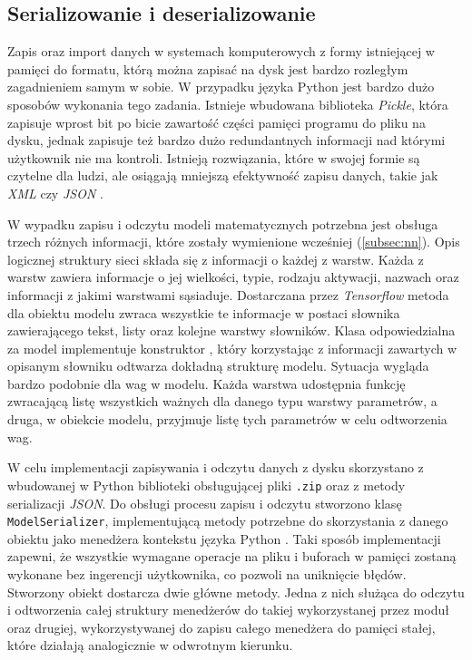 \subsection{Serializowanie i deserializowanie}
Zapis oraz import danych w systemach komputerowych z formy istniejącej w pamięci do formatu, którą można zapisać na dysk jest bardzo rozległym zagadnieniem samym w sobie. W przypadku języka Python jest bardzo dużo sposobów wykonania tego zadania. Istnieje wbudowana biblioteka \textit{Pickle}, która zapisuje wprost bit po bicie zawartość części pamięci programu do pliku na dysku, jednak zapisuje też bardzo dużo redundantnych informacji nad którymi użytkownik nie ma kontroli. Istnieją rozwiązania, które w swojej formie są czytelne dla ludzi, ale osiągają mniejszą efektywność zapisu danych, takie jak \textit{XML} \cite{book:xml_handbook} czy \textit{JSON} \cite{book:json_for_begginers}. 

W wypadku zapisu i odczytu modeli matematycznych potrzebna jest obsługa trzech różnych informacji, które zostały wymienione wcześniej (\ref{subsec:nn}). Opis logicznej struktury sieci składa się z informacji o każdej z warstw. Każda z warstw zawiera informacje o jej wielkości, typie, rodzaju aktywacji, nazwach oraz informacji z jakimi warstwami sąsiaduje. Dostarczana przez \textit{Tensorflow} metoda dla obiektu modelu zwraca wszystkie te informacje w postaci słownika zawierającego tekst, listy oraz kolejne warstwy słowników. Klasa odpowiedzialna za model implementuje konstruktor \cite{book:czysty_kod}, który korzystając z informacji zawartych w opisanym słowniku odtwarza dokładną strukturę modelu. Sytuacja wygląda bardzo podobnie dla wag w modelu. Każda warstwa udostępnia funkcję zwracającą listę wszystkich ważnych dla danego typu warstwy parametrów, a druga, w obiekcie modelu, przyjmuje listę tych parametrów w celu odtworzenia wag.

W celu implementacji zapisywania i odczytu danych z dysku skorzystano z wbudowanej w Python biblioteki obsługującej pliki \verb+.zip+ oraz z metody serializacji \textit{JSON}. Do obsługi procesu zapisu i odczytu stworzono klasę \verb+ModelSerializer+, implementującą metody potrzebne do skorzystania z danego obiektu jako menedżera kontekstu języka Python \cite{book:learning_python}. Taki sposób implementacji zapewni, że wszystkie wymagane operacje na pliku i buforach w pamięci zostaną wykonane bez ingerencji użytkownika, co pozwoli na uniknięcie błędów. Stworzony obiekt dostarcza dwie główne metody. Jedna z nich służąca do odczytu i odtworzenia całej struktury menedżerów do takiej wykorzystanej przez moduł oraz drugiej, wykorzystywanej do zapisu całego menedżera do pamięci stałej, które działają analogicznie w odwrotnym kierunku.


